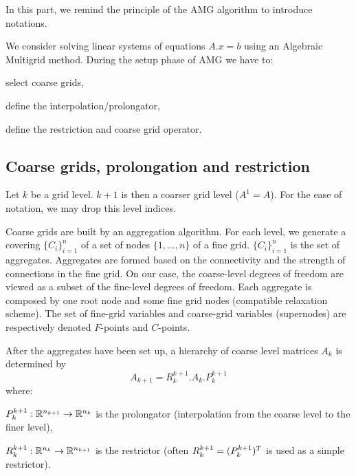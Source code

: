 
In this part, we remind the principle of the AMG algorithm to introduce notations.

We consider solving linear systems of equations 
$A.x= b$ using an Algebraic Multigrid method.
%
During the setup phase of AMG we have to:
\begin{myitem}
\item select coarse grids,
\item define the interpolation/prolongator,
\item define the restriction and coarse grid operator.
\end{myitem}


\subsection{Coarse grids, prolongation and restriction}

Let $k$ be a grid level. $k+1$ is then a coarser grid level ($A^1 = A$).
For the ease of notation, we may drop this level indices. 

Coarse grids are built by an aggregation algorithm. For each level, we
generate a covering $\{C_i\}_{i=1}^n$ of a set of nodes
$\{1,\dots,n\}$ of a fine grid. $\{C_i\}_{i=1}^n$ is the set of
aggregates. Aggregates are formed based on the connectivity and the strength of connections in the fine grid.
On our case, the coarse-level degrees of freedom are viewed as a subset of the fine-level degrees of freedom.
Each aggregate is composed by one root node and some fine
grid nodes (compatible relaxation scheme). The set of fine-grid variables
and coarse-grid variables (supernodes) are respectively denoted $F$-points and $C$-points.

After the aggregates have been set up, a hierarchy of coarse level matrices $A_k$ is determined by
$$A_{k+1} = R_{k}^{k+1} . A_k . P_{k}^{k+1}$$ \noindent where:
\begin{myitem}
\item $P_{k}^{k+1}: \mathbb{R}^{n_{k+1}} \rightarrow \mathbb{R}^{n_{k}}$ is the prolongator (interpolation from the coarse level to the finer level),
\item $R_{k}^{k+1}: \mathbb{R}^{n_{k}} \rightarrow \mathbb{R}^{n_{k+1}}$ is the restrictor (often $R_{k}^{k+1} = (P_{k}^{k+1})^T$ is used as a simple restrictor).
\end{myitem}

